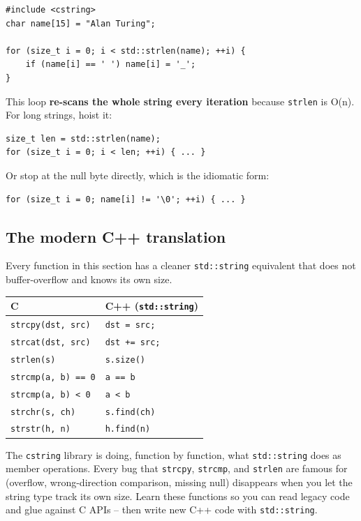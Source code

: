 \documentclass[11pt]{article}
\begin{document}
\begin{examplebox}
\begin{verbatim}
#include <cstring>
char name[15] = "Alan Turing";

for (size_t i = 0; i < std::strlen(name); ++i) {
    if (name[i] == ' ') name[i] = '_';
}
\end{verbatim}
This loop \textbf{re-scans the whole string every iteration} because
\texttt{strlen} is O(n). For long strings, hoist it:
\begin{verbatim}
size_t len = std::strlen(name);
for (size_t i = 0; i < len; ++i) { ... }
\end{verbatim}
Or stop at the null byte directly, which is the idiomatic form:
\begin{verbatim}
for (size_t i = 0; name[i] != '\0'; ++i) { ... }
\end{verbatim}
\end{examplebox}

\subsection{The modern C++ translation}

Every function in this section has a cleaner \texttt{std::string}
equivalent that does not buffer-overflow and knows its own size.

\begin{center}
\small
\begin{tabular}{ll}
\textbf{C} & \textbf{C++} (\texttt{std::string}) \\
\hline
\texttt{strcpy(dst, src)} & \texttt{dst = src;} \\
\texttt{strcat(dst, src)} & \texttt{dst += src;} \\
\texttt{strlen(s)} & \texttt{s.size()} \\
\texttt{strcmp(a, b) == 0} & \texttt{a == b} \\
\texttt{strcmp(a, b) < 0} & \texttt{a < b} \\
\texttt{strchr(s, ch)} & \texttt{s.find(ch)} \\
\texttt{strstr(h, n)} & \texttt{h.find(n)} \\
\end{tabular}
\normalsize
\end{center}

\begin{ideabox}
The \texttt{cstring} library is doing, function by function, what
\texttt{std::string} does as member operations. Every bug that
\texttt{strcpy}, \texttt{strcmp}, and \texttt{strlen} are famous for
(overflow, wrong-direction comparison, missing null) disappears when
you let the string type track its own size. Learn these functions so
you can read legacy code and glue against C APIs -- then write new C++
code with \texttt{std::string}.
\end{ideabox}
\end{document}
